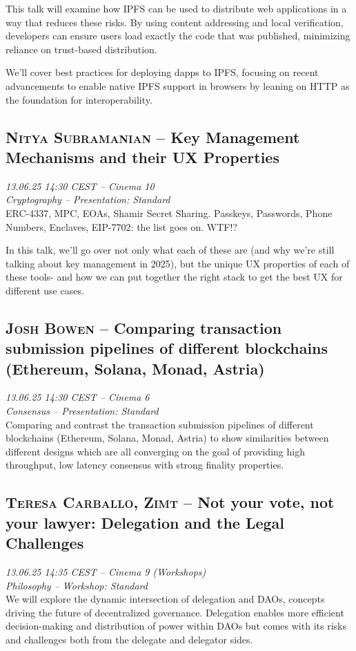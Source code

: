 This talk will examine how IPFS can be used to distribute web applications in a way that reduces these risks. By using content addressing and local verification, developers can ensure users load exactly the code that was published, minimizing reliance on trust-based distribution.

We’ll cover best practices for deploying dapps to IPFS, focusing on recent advancements to enable native IPFS support in browsers by leaning on HTTP as the foundation for interoperability.

\clearpage
\subsection {\textsc{Nitya Subramanian}  -- Key Management Mechanisms and their UX Properties} \noindent \textit {13.06.25 14:30 CEST -- Cinema 10\\ Cryptography -- Presentation: Standard}\\[1em] ERC-4337, MPC, EOAs, Shamir Secret Sharing. Passkeys, Passwords, Phone Numbers, Enclaves, EIP-7702: the list goes on. WTF!?

In this talk, we'll go over not only what each of these are (and why we're still talking about key management in 2025), but the unique UX properties of each of these tools- and how we can put together  the right stack to get the best UX for different use cases.

\clearpage
\subsection {\textsc{Josh Bowen}  -- Comparing transaction submission pipelines of different blockchains (Ethereum, Solana, Monad, Astria)} \noindent \textit {13.06.25 14:30 CEST -- Cinema 6\\ Consensus -- Presentation: Standard}\\[1em] Comparing and contrast the transaction submission pipelines of different blockchains (Ethereum, Solana, Monad, Astria) to show similarities between different designs which are all converging on the goal of providing high throughput, low latency consensus with strong finality properties.

\clearpage
\subsection {\textsc{Teresa Carballo, Zimt}  -- Not your vote, not your lawyer: Delegation and the Legal Challenges} \noindent \textit {13.06.25 14:35 CEST -- Cinema 9 (Workshops)\\ Philosophy -- Workshop: Standard}\\[1em] We will explore the dynamic intersection of delegation and DAOs, concepts driving the future of decentralized governance. Delegation enables more efficient decision-making and distribution of power within DAOs but comes with its risks and challenges both from the delegate and delegator sides.

